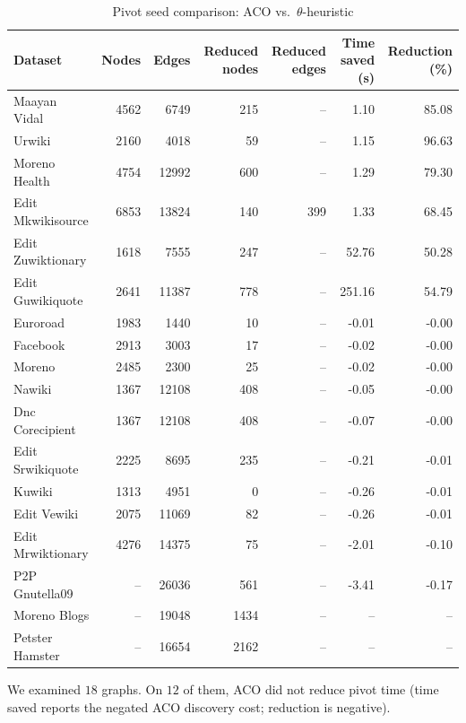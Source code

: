 \begin{table}[htbp]
  \centering
  \caption{Pivot seed comparison: ACO vs.\ $\theta$-heuristic}
  \label{tab:seed-compare}
  \setlength{\tabcolsep}{4pt}
  \begin{tabular}{lrrrrrr}
    \toprule
    Dataset & Nodes & Edges & Reduced nodes & Reduced edges & Time saved (s) & Reduction (\%) \\
    \midrule
    Maayan Vidal & 4562 & 6749 & 215 & -- & 1.10 & 85.08 \\
    Urwiki & 2160 & 4018 & 59 & -- & 1.15 & 96.63 \\
    Moreno Health & 4754 & 12992 & 600 & -- & 1.29 & 79.30 \\
    Edit Mkwikisource & 6853 & 13824 & 140 & 399 & 1.33 & 68.45 \\
    Edit Zuwiktionary & 1618 & 7555 & 247 & -- & 52.76 & 50.28 \\
    Edit Guwikiquote & 2641 & 11387 & 778 & -- & 251.16 & 54.79 \\
    \midrule
    Euroroad & 1983 & 1440 & 10 & -- & -0.01 & -0.00 \\
    Facebook & 2913 & 3003 & 17 & -- & -0.02 & -0.00 \\
    Moreno & 2485 & 2300 & 25 & -- & -0.02 & -0.00 \\
    Nawiki & 1367 & 12108 & 408 & -- & -0.05 & -0.00 \\
    Dnc Corecipient & 1367 & 12108 & 408 & -- & -0.07 & -0.00 \\
    Edit Srwikiquote & 2225 & 8695 & 235 & -- & -0.21 & -0.01 \\
    Kuwiki & 1313 & 4951 & 0 & -- & -0.26 & -0.01 \\
    Edit Vewiki & 2075 & 11069 & 82 & -- & -0.26 & -0.01 \\
    Edit Mrwiktionary & 4276 & 14375 & 75 & -- & -2.01 & -0.10 \\
    P2P Gnutella09 & -- & 26036 & 561 & -- & -3.41 & -0.17 \\
    Moreno Blogs & -- & 19048 & 1434 & -- & -- & -- \\
    Petster Hamster & -- & 16654 & 2162 & -- & -- & -- \\
    \bottomrule
  \end{tabular}
\end{table}

We examined $18$ graphs. On $12$ of them, ACO did not reduce pivot time (time saved reports the negated ACO discovery cost; reduction is negative).

